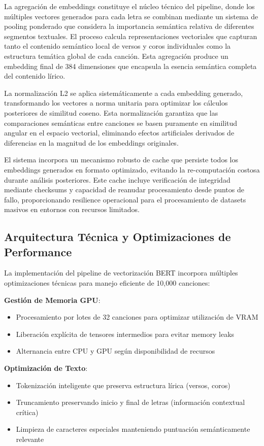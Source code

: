 \documentclass[12pt,a4paper]{report}
\begin{document}
La agregación de embeddings constituye el núcleo técnico del pipeline, donde los múltiples vectores generados para cada letra se combinan mediante un sistema de pooling ponderado que considera la importancia semántica relativa de diferentes segmentos textuales. El proceso calcula representaciones vectoriales que capturan tanto el contenido semántico local de versos y coros individuales como la estructura temática global de cada canción. Esta agregación produce un embedding final de 384 dimensiones que encapsula la esencia semántica completa del contenido lírico.

La normalización L2 se aplica sistemáticamente a cada embedding generado, transformando los vectores a norma unitaria para optimizar los cálculos posteriores de similitud coseno. Esta normalización garantiza que las comparaciones semánticas entre canciones se basen puramente en similitud angular en el espacio vectorial, eliminando efectos artificiales derivados de diferencias en la magnitud de los embeddings originales.

El sistema incorpora un mecanismo robusto de cache que persiste todos los embeddings generados en formato optimizado, evitando la re-computación costosa durante análisis posteriores. Este cache incluye verificación de integridad mediante checksums y capacidad de reanudar procesamiento desde puntos de fallo, proporcionando resilience operacional para el procesamiento de datasets masivos en entornos con recursos limitados.

\subsection{Arquitectura Técnica y Optimizaciones de Performance}

La implementación del pipeline de vectorización BERT incorpora múltiples optimizaciones técnicas para manejo eficiente de 10,000 canciones:

\textbf{Gestión de Memoria GPU}:
\begin{itemize}
\item Procesamiento por lotes de 32 canciones para optimizar utilización de VRAM
\item Liberación explícita de tensores intermedios para evitar memory leaks
\item Alternancia entre CPU y GPU según disponibilidad de recursos
\end{itemize}

\textbf{Optimización de Texto}:
\begin{itemize}
\item Tokenización inteligente que preserva estructura lírica (versos, coros)
\item Truncamiento preservando inicio y final de letras (información contextual crítica)
\item Limpieza de caracteres especiales manteniendo puntuación semánticamente relevante
\end{itemize}
\end{document}

